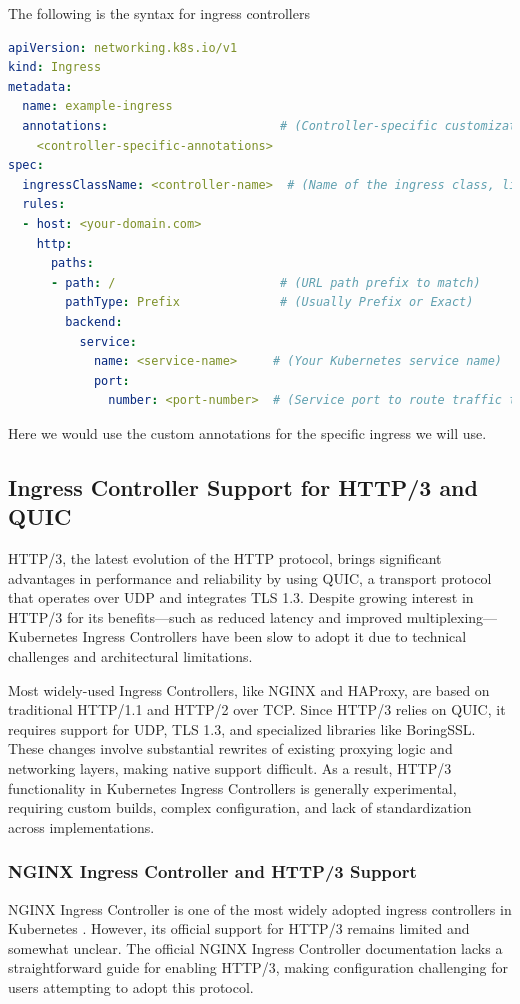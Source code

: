 The following is the syntax for ingress controllers
\begin{lstlisting}[language=yaml]
apiVersion: networking.k8s.io/v1
kind: Ingress
metadata:
  name: example-ingress
  annotations:                        # (Controller-specific customizations go here)
    <controller-specific-annotations>
spec:
  ingressClassName: <controller-name>  # (Name of the ingress class, like nginx, alb, kong)
  rules:
  - host: <your-domain.com>
    http:
      paths:
      - path: /                       # (URL path prefix to match)
        pathType: Prefix              # (Usually Prefix or Exact)
        backend:
          service:
            name: <service-name>     # (Your Kubernetes service name)
            port:
              number: <port-number>  # (Service port to route traffic to)
\end{lstlisting}
Here we would use the custom annotations for the specific ingress we will use.


\subsection{Ingress Controller Support for HTTP/3 and QUIC}
HTTP/3, the latest evolution of the HTTP protocol, brings significant advantages in performance and reliability by using QUIC, a transport protocol that operates over UDP and integrates TLS 1.3. Despite growing interest in HTTP/3 for its benefits—such as reduced latency and improved multiplexing—Kubernetes Ingress Controllers have been slow to adopt it due to technical challenges and architectural limitations.

Most widely-used Ingress Controllers, like NGINX and HAProxy, are based on traditional HTTP/1.1 and HTTP/2 over TCP. Since HTTP/3 relies on QUIC, it requires support for UDP, TLS 1.3, and specialized libraries like BoringSSL. These changes involve substantial rewrites of existing proxying logic and networking layers, making native support difficult. As a result, HTTP/3 functionality in Kubernetes Ingress Controllers is generally experimental, requiring custom builds, complex configuration, and lack of standardization across implementations.


\subsubsection{NGINX Ingress Controller and HTTP/3 Support}

NGINX Ingress Controller is one of the most widely adopted ingress controllers in Kubernetes \cite{nginx-ingress-docs}. However, its official support for HTTP/3 remains limited and somewhat unclear. The official NGINX Ingress Controller documentation lacks a straightforward guide for enabling HTTP/3, making configuration challenging for users attempting to adopt this protocol.

